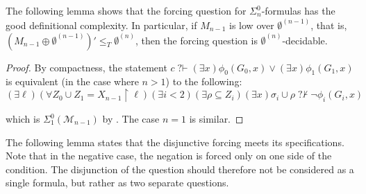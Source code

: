 \documentclass{article}
\def\M{\mathcal{M}}
\newcommand{\qvdash}{\operatorname{{?}{\vdash}}}
\newcommand{\nqvdash}{\operatorname{{?}{\nvdash}}}
\newcommand{\uh}{\upharpoonright}
\numberwithin{theorem}{section}
\newtheorem{lemma}[theorem]{Lemma}
\theoremstyle{definition}
\begin{document}
The following lemma shows that the forcing question for $\Sigma^0_n$-formulas has the good definitional complexity.
In particular, if $M_{n-1}$ is low over $\emptyset^{(n-1)}$, that is, $(M_{n-1} \oplus \emptyset^{(n-1)})' \leq_T \emptyset^{(n)}$, then the forcing question is $\emptyset^{(n)}$-decidable.


\begin{proof}
By compactness, the statement $c \qvdash (\exists x)\phi_0(G_0,x) \vee (\exists x)\phi_1(G_1,x)$ is equivalent (in the case where $n > 1$) to the following:
$$(\exists \ell)(\forall Z_0 \cup Z_1 = X_{n-1} \uh \ell)(\exists i < 2)(\exists \rho \subseteq Z_i)(\exists x)\sigma_i \cup \rho \nqvdash \neg \phi_i(G_i,x)$$

which is $\Sigma^0_1(\M_{n-1})$ by . The case $n = 1$ is similar.
\end{proof}

The following lemma states that the disjunctive forcing meets its specifications.
Note that in the negative case, the negation is forced only on one side of the condition. The disjunction of the question should therefore not be considered as a single formula, but rather as two separate questions.
\end{document}
